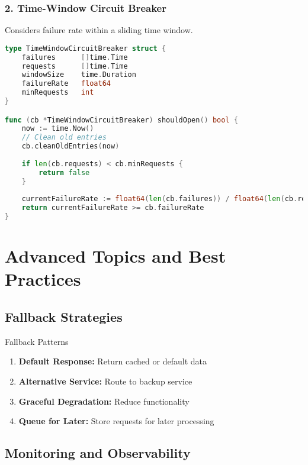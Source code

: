 \documentclass[12pt,a4paper]{article}
\begin{document}
\subsubsection{2. Time-Window Circuit Breaker}
Considers failure rate within a sliding time window.

\begin{lstlisting}[language=Go, caption=Time-Window Circuit Breaker Logic]
type TimeWindowCircuitBreaker struct {
    failures      []time.Time
    requests      []time.Time
    windowSize    time.Duration
    failureRate   float64
    minRequests   int
}

func (cb *TimeWindowCircuitBreaker) shouldOpen() bool {
    now := time.Now()
    // Clean old entries
    cb.cleanOldEntries(now)
    
    if len(cb.requests) < cb.minRequests {
        return false
    }
    
    currentFailureRate := float64(len(cb.failures)) / float64(len(cb.requests))
    return currentFailureRate >= cb.failureRate
}
\end{lstlisting}

\section{Advanced Topics and Best Practices}

\subsection{Fallback Strategies}

\begin{examplebox}{Fallback Patterns}
\begin{enumerate}
    \item \textbf{Default Response:} Return cached or default data
    \item \textbf{Alternative Service:} Route to backup service
    \item \textbf{Graceful Degradation:} Reduce functionality
    \item \textbf{Queue for Later:} Store requests for later processing
\end{enumerate}
\end{examplebox}

\subsection{Monitoring and Observability}
\end{document}
